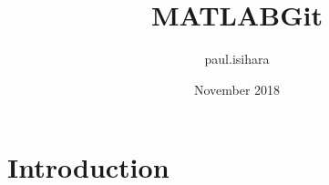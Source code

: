 \documentclass{article}
\title{MATLABGit}
\author{paul.isihara }
\date{November 2018}
\begin{document}
\maketitle

\section{Introduction}
\end{document}
